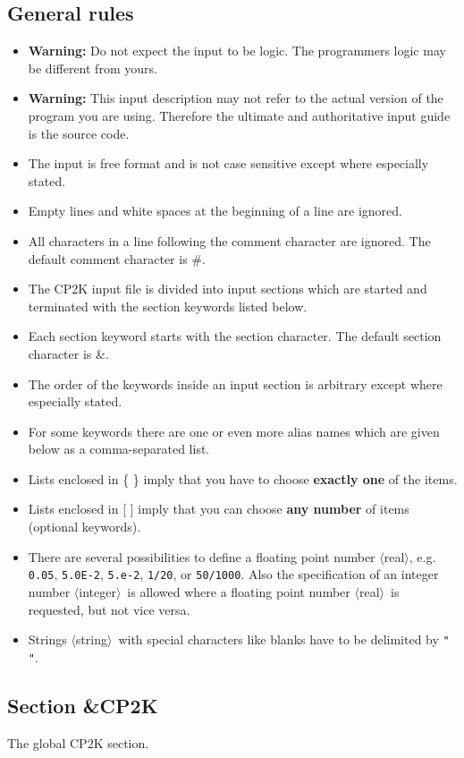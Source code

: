 \documentclass[12pt,twoside,a4paper]{article}
\newcommand{\kf}{\tt} %
\newcommand{\kw}[1]{{\kf #1}} %
\newcommand{\isr}[1]{\index{input sections, required!\kw{#1}}}
\newcommand{\bi}{\begin{itemize}}
\newcommand{\ei}{\end{itemize}}
\newcommand{\la}{$\langle$}
\newcommand{\ra}{$\rangle$}
\begin{document}
\subsection{General rules}
%
\bi
 \item {\bf Warning:} Do not expect the input to be logic.
       The programmers logic may be different from yours.
 \item {\bf Warning:} This input description may not refer to the
       actual version of the program you are using. Therefore the
       ultimate and authoritative input guide is the source code.
 \item The input is free format and is not case sensitive except where
       especially stated.
 \item Empty lines and white spaces at the beginning of a line are ignored.
 \item All characters in a line following the comment character are ignored.
       The default comment character is \#.
 \item The CP2K input file is divided into input sections which are started
       and terminated with the section keywords listed below.
 \item Each section keyword starts with the section character.
       The default section character is \&.
 \item The order of the keywords inside an input section is arbitrary
       except where especially stated.
 \item For some keywords there are one or even more alias names which are
       given below as a comma-separated list.
 \item Lists enclosed in \{ \} imply that you have to choose
       {\bf exactly one} of the items.
 \item Lists enclosed in [ ] imply that you can choose
       {\bf any number} of items (optional keywords).
 \item There are several possibilities to define a floating point number
       \la real\ra, e.g. {\tt 0.05}, {\tt 5.0E-2}, {\tt 5.e-2},
       {\tt 1/20}, or {\tt 50/1000}. Also the specification of an
       integer number \la integer\ra\ is allowed where a floating point
       number \la real\ra\ is requested, but not vice versa.
 \item Strings \la string\ra\ with special characters like blanks have
       to be delimited by \kw{" "}.
\ei
%
\subsection{Section \&CP2K}
\isr{\&CP2K}
%
The global CP2K section.
%
\end{document}
